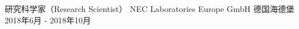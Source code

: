\cventry
{研究科学家（Research Scientist）} %
{NEC Laboratories Europe GmbH} %
{德国海德堡} %
{2018年6月 - 2018年10月} %
{ %
}
